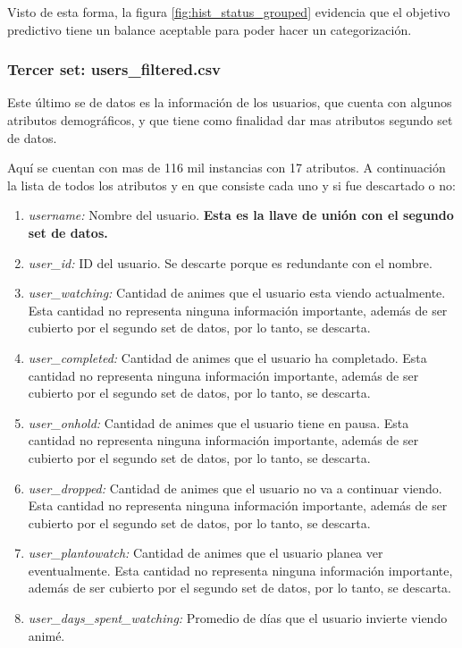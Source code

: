 \documentclass[a4paper]{article}
\begin{document}
Visto de esta forma, la figura \ref{fig:hist_status_grouped} evidencia que el objetivo predictivo tiene un balance aceptable para poder hacer un categorización.

\subsubsection{Tercer set: users\_filtered.csv}
Este último se de datos es la información de los usuarios, que cuenta con algunos atributos demográficos, y que tiene como finalidad dar mas atributos segundo set de datos.

Aquí se cuentan con mas de 116 mil instancias con 17 atributos. A continuación la lista de todos los atributos y en que consiste cada uno y si fue descartado o no:
\begin{enumerate}
    \item \textit{username:} Nombre del usuario. \textbf{Esta es la llave de unión con el segundo set de datos.}
    \item \textit{user\_id:} ID del usuario. Se descarte porque es redundante con el nombre.
    \item \textit{user\_watching:} Cantidad de animes que el usuario esta viendo actualmente. Esta cantidad no representa ninguna información importante, además de ser cubierto por el segundo set de datos, por lo tanto, se descarta.
    \item \textit{user\_completed:} Cantidad de animes que el usuario ha completado. Esta cantidad no representa ninguna información importante, además de ser cubierto por el segundo set de datos, por lo tanto, se descarta.
    \item \textit{user\_onhold:} Cantidad de animes que el usuario tiene en pausa. Esta cantidad no representa ninguna información importante, además de ser cubierto por el segundo set de datos, por lo tanto, se descarta.
    \item \textit{user\_dropped:} Cantidad de animes que el usuario no va a continuar viendo. Esta cantidad no representa ninguna información importante, además de ser cubierto por el segundo set de datos, por lo tanto, se descarta.
    \item \textit{user\_plantowatch:} Cantidad de animes que el usuario planea ver eventualmente. Esta cantidad no representa ninguna información importante, además de ser cubierto por el segundo set de datos, por lo tanto, se descarta.
    \item \textit{user\_days\_spent\_watching:} Promedio de días que el usuario invierte viendo animé.

\end{enumerate}
\end{document}
